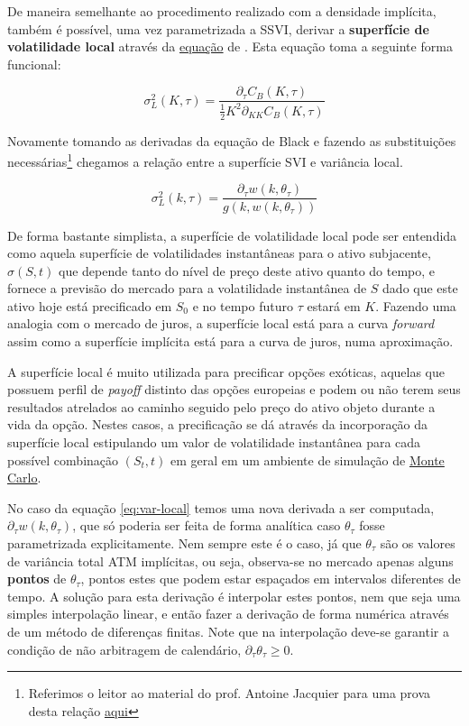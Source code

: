 \documentclass[]{book}
\let\rmarkdownfootnote\footnote%
\def\footnote{\protect\rmarkdownfootnote}
\theoremstyle{definition}
\theoremstyle{definition}
\theoremstyle{definition}
\theoremstyle{remark}
\begin{document}
De maneira semelhante ao procedimento realizado com a densidade
implícita, também é possível, uma vez parametrizada a SSVI, derivar a
\textbf{superfície de volatilidade local} através da
\protect\hyperlink{superficies}{equação} de \citep{Dupire1994}. Esta
equação toma a seguinte forma funcional:

\begin{equation}
\sigma_L^2(K, \tau)=\frac{\partial_\tau C_B(K, \tau)}{\frac{1}{2}K^2\partial_{KK}C_B(K, \tau)}
\label{eq:dupire}
\end{equation}

Novamente tomando as derivadas da equação de Black e fazendo as
substituições necessárias\footnote{Referimos o leitor ao material do
  prof. Antoine Jacquier para uma prova desta relação
  \href{http://wwwf.imperial.ac.uk/~ajacquie/IC_AMDP/IC_AMDP_Docs/AMDP.pdf}{aqui}}
chegamos a relação entre a superfície SVI e variância local.

\begin{equation}
\sigma^2_L(k, \tau)=\frac{\partial_\tau w(k, \theta_\tau)}{g(k, w(k, \theta_\tau))}
\label{eq:var-local}
\end{equation}

De forma bastante simplista, a superfície de volatilidade local pode ser
entendida como aquela superfície de volatilidades instantâneas para o
ativo subjacente, \(\sigma(S, t)\) que depende tanto do nível de preço
deste ativo quanto do tempo, e fornece a previsão do mercado para a
volatilidade instantânea de \(S\) dado que este ativo hoje está
precificado em \(S_0\) e no tempo futuro \(\tau\) estará em \(K\).
Fazendo uma analogia com o mercado de juros, a superfície local está
para a curva \emph{forward} assim como a superfície implícita está para
a curva de juros, numa aproximação.

A superfície local é muito utilizada para precificar opções exóticas,
aquelas que possuem perfil de \emph{payoff} distinto das opções
europeias e podem ou não terem seus resultados atrelados ao caminho
seguido pelo preço do ativo objeto durante a vida da opção. Nestes
casos, a precificação se dá através da incorporação da superfície local
estipulando um valor de volatilidade instantânea para cada possível
combinação \((S_t, t)\) em geral em um ambiente de simulação de
\protect\hyperlink{monte-carlo}{Monte Carlo}.

No caso da equação \eqref{eq:var-local} temos uma nova derivada a ser
computada, \(\partial_\tau w(k, \theta_\tau)\), que só poderia ser feita
de forma analítica caso \(\theta_\tau\) fosse parametrizada
explicitamente. Nem sempre este é o caso, já que \(\theta_\tau\) são os
valores de variância total ATM implícitas, ou seja, observa-se no
mercado apenas alguns \textbf{pontos} de \(\theta_\tau\), pontos estes
que podem estar espaçados em intervalos diferentes de tempo. A solução
para esta derivação é interpolar estes pontos, nem que seja uma simples
interpolação linear, e então fazer a derivação de forma numérica através
de um método de diferenças finitas. Note que na interpolação deve-se
garantir a condição de não arbitragem de calendário,
\(\partial_\tau\theta_\tau\geq 0\).
\end{document}
